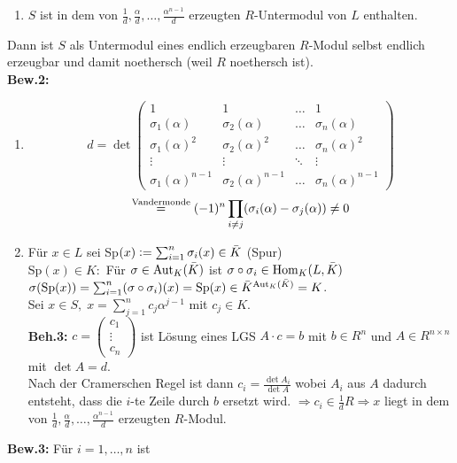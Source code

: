 \documentclass[a4paper, 10pt]{report}
\begin{document}
\begin{Bew}
\begin{enumerate}
  \item $S$ ist in dem von $\frac{1}{d}, \frac{\alpha}{d}, \dots,
  \frac{\alpha^{n-1}}{d}$ erzeugten $R$-Untermodul von $L$ enthalten.
\end{enumerate}
Dann ist $S$ als Untermodul eines endlich erzeugbaren $R$-Modul selbst endlich
erzeugbar und damit noethersch (weil $R$ noethersch ist).\\
\textbf{Bew.2:}
\begin{enumerate}
  \item
  \[
  d = \det
  \begin{pmatrix}
  1 & 1 & \dots & 1 \\
  \sigma_1(\alpha) & \sigma_2(\alpha) & \dots & \sigma_n(\alpha) \\
  \sigma_1(\alpha)^2 & \sigma_2(\alpha)^2 & \dots & \sigma_n(\alpha)^2 \\
  \vdots & \vdots & \ddots & \vdots \\
  \sigma_1(\alpha)^{n-1} & \sigma_2(\alpha)^{n-1} & \dots & \sigma_n(\alpha)^{n-1}
  \end{pmatrix}
\]
\[
  \overset{\text{\scriptsize Vandermonde}}{=}(-1)^n \prod_{i \not= j}
  (\sigma_i(\alpha) - \sigma_j(\alpha)) \not= 0
\]
  \item Für $x \in L$ sei Sp$(x) \mathrel{\mathop:}= \sum_{i=1}^n \sigma_i(x) \in \bar{K}$
  (\glqq Spur\grqq)\\
  Sp$(x) \in K:$ Für $\sigma \in \Aut[K]{\bar{K}}$ ist $\sigma \circ \sigma_i \in
  \Hom[K]{L}{\bar{K}}$\\
  $\sigma(\Sp(x)) = \sum_{i=1}^n (\sigma \circ \sigma_i)(x) = \Sp(x)
  \in \bar{K}^{\Aut[K]{\bar{K}}} = K$.\\
  Sei $x \in S, \; x = \sum_{j=1}^n c_j \alpha^{j-1}$ mit $c_j \in K$.\\
  \textbf{Beh.3:} $c = \begin{pmatrix} c_1\\ \vdots\\ c_n \end{pmatrix}$ ist
  Lösung eines LGS $A \cdot c = b$ mit $b \in R^n$ und $A \in R^{n \times n}$
  mit $\det A = d$.\\
  Nach der Cramerschen Regel ist dann $c_i = \frac{\det A_i}{\det A}$ wobei
  $A_i$ aus $A$ dadurch entsteht, dass die $i$-te Zeile durch $b$ ersetzt wird.
  $\Rightarrow c_i \in \frac{1}{d}R \Rightarrow x$ liegt in dem von $\frac{1}{d}, \frac{\alpha}{d}, \dots,
  \frac{\alpha^{n-1}}{d}$ erzeugten $R$-Modul.
\end{enumerate}
\textbf{Bew.3:} Für $i=1, \dots, n$ ist

\end{Bew}
\end{document}
